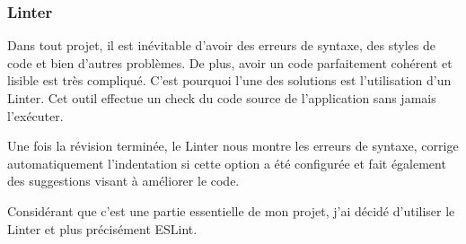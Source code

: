 \subsubsection{Linter}
Dans tout projet, il est inévitable d'avoir des erreurs de syntaxe, des styles de code et bien d'autres problèmes. De plus, avoir un code parfaitement cohérent et lisible est très compliqué. C'est pourquoi l'une des solutions est l'utilisation d'un Linter. Cet outil effectue un check du code source de l'application sans jamais l'exécuter.

Une fois la révision terminée, le Linter nous montre les erreurs de syntaxe, corrige automatiquement l'indentation si cette option a été configurée et fait également des suggestions visant à améliorer le code.

Considérant que c'est une partie essentielle de mon projet, j'ai décidé d'utiliser le Linter et plus précisément ESLint.